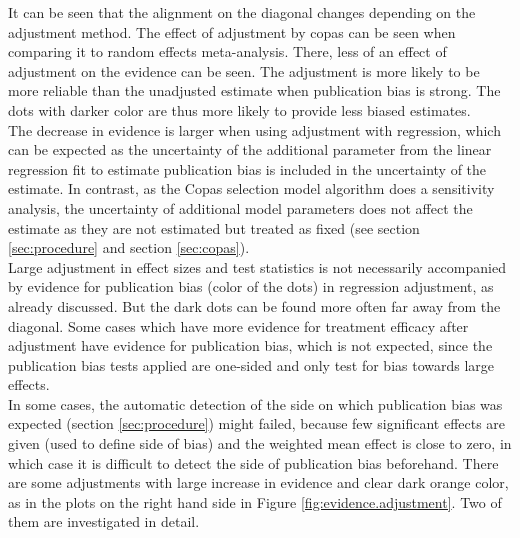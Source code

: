 \documentclass[11pt,a4paper,twoside]{book}\usepackage[]{graphicx}\usepackage[]{color}
\begin{document}


It can be seen that the alignment on the diagonal changes depending on the adjustment method. The effect of adjustment by copas can be seen when comparing it to random effects meta-analysis. There, less of an effect of adjustment on the evidence can be seen. The adjustment is more likely to be more reliable than the unadjusted estimate when publication bias is strong. The dots with darker color are thus more likely to provide less biased estimates.\\
The decrease in evidence is larger when using adjustment with regression, which can be expected as the uncertainty of the additional parameter from the linear regression fit to estimate publication bias is included in the uncertainty of the estimate. In contrast, as the Copas selection model algorithm does a sensitivity analysis, the uncertainty of additional model parameters does not affect the estimate as they are not estimated but treated as fixed (see section \ref{sec:procedure} and section \ref{sec:copas}).\\
Large adjustment in effect sizes and test statistics is not necessarily accompanied by evidence for publication bias (color of the dots) in regression adjustment, as already discussed. But the dark dots can be found more often far away from the diagonal. Some cases which have more evidence for treatment efficacy after adjustment have evidence for publication bias, which is not expected, since the publication bias tests applied are one-sided and only test for bias towards large effects. \\
In some cases, the automatic detection of the side on which publication bias was expected (section \ref{sec:procedure}) might failed, because few significant effects are given (used to define side of bias) and the weighted mean effect is close to zero, in which case it is difficult to detect the side of publication bias beforehand. There are some adjustments with large increase in evidence and clear dark orange color, as in the plots on the right hand side in Figure \ref{fig:evidence.adjustment}. Two of them are investigated in detail. 
\end{document}
